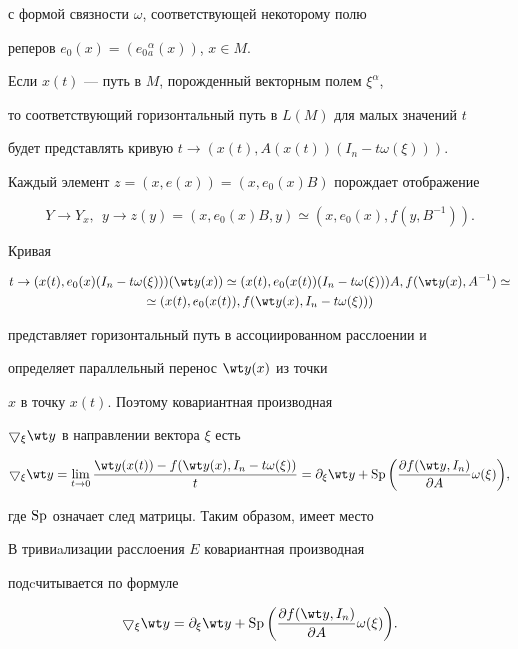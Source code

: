 с формой связности $\omega$, соответствующей некоторому полю


реперов $e_0(x)=(e_0{}^\alpha_a(x))$, $x\in M$.


Если $x(t)$ --- путь в $M$, порожденный векторным полем $\xi^\alpha$, 


то соответствующий горизонтальный путь в $L(M)$ для малых значений $t$


будет представлять кривую $t\to (x(t),A(x(t)) (I_n-t\omega(\xi)))$.


Каждый элемент $z=(x,e(x))=(x,e_0(x)B)$ порождает отображение


$$


Y\to Y_x,\ \ y\to z( y)=


(x,e_0(x)B, y)\simeq(x,e_0(x),f(y,B^{-1})).


$$


Кривая


\begin{multline*}


t\to (x(t),e_0(x)(I_n-t\omega(\xi)))(\wt y(x))\simeq


(x(t),e_0(x(t))(I_n-t\omega(\xi)))A,


f(\wt y(x),A^{-1})\simeq \\


\simeq (x(t),e_0(x(t)),f(\wt y(x),I_n-t\omega(\xi)))


\end{multline*}


представляет горизонтальный путь в ассоциированном расслоении и


определяет параллельный перенос $\wt y(x)$ из точки


$x$ в точку $x(t)$. Поэтому ковариантная производная


$\bigtriangledown_\xi\wt y$ в направлении вектора $\xi$  есть


$$


\bigtriangledown_\xi\wt y=\lim_{t\to 0}\frac{\wt y(x(t))-


f( \wt y(x),I_n-t\omega(\xi))}{t}=\partial_\xi\wt y+


\SP\bigg( \frac{\partial f(\wt y,I_n)}{\partial A}


\omega(\xi)\bigg),


$$


где $\operatorname{Sp}$ означает след матрицы. Таким образом, имеет место





\begin{thm}


В тривиaлизации расслоения $E$ ковариантная производная


подcчитывается по формуле


$$


\bigtriangledown_\xi\wt y=\partial_\xi\wt y+


\SP\bigg( \frac{\partial f(\wt y,I_n)}{\partial A}\omega(\xi)\bigg).


$$


\end{thm}





